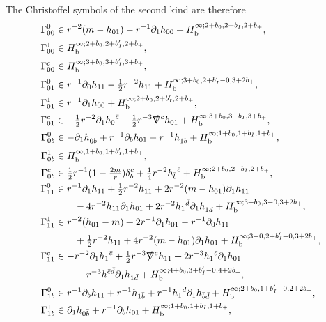\documentclass[reqno,11pt,letterpaper]{amsart}
\numberwithin{equation}{section}
\numberwithin{figure}{section}
\theoremstyle{definition}
\theoremstyle{remark}
\newcommand{\slnabla}{\slashed{\nabla}{}}
\newcommand{\pa}{\partial}
\newcommand{\bop}{{\mathrm{b}}}
\newcommand{\half}{\tfrac{1}{2}}
\newcommand{\Hb}{H_{\bop}}
\begin{document}
The Christoffel symbols of the second kind are therefore
\begin{align}
\label{EqCoPertGamma}
  \Gamma^0_{0 0} &\in r^{-2}(m-h_{0 1}) - r^{-1}\pa_1 h_{0 0} + \Hb^{\infty;2+b_0,2+b_I,2+b_+}, \\
  \Gamma^1_{0 0} &\in \Hb^{\infty;2+b_0,2+b'_I,2+b_+}, \nonumber\\
  \Gamma^c_{0 0} &\in \Hb^{\infty;3+b_0,3+b'_I,3+b_+}, \nonumber\\
  \Gamma^0_{0 1} &\in r^{-1}\pa_0 h_{1 1}-\half r^{-2}h_{1 1}+\Hb^{\infty;3+b_0,2+b'_I-0,3+2 b_+}, \nonumber\\
  \Gamma^1_{0 1} &\in r^{-1}\pa_1 h_{0 0} + \Hb^{\infty;2+b_0,2+b'_I,2+b_+}, \nonumber\\
  \Gamma^c_{0 1} &\in -\half r^{-2}\pa_1 h_0{}^{\bar c}+\half r^{-3}\slnabla^c h_{0 1} + \Hb^{\infty;3+b_0,3+b_I,3+b_+}, \nonumber\\
  \Gamma^0_{0 b} &\in -\pa_1 h_{0\bar b}+r^{-1}\pa_b h_{0 1}-r^{-1}h_{1\bar b} + \Hb^{\infty;1+b_0,1+b_I,1+b_+}, \nonumber\\
  \Gamma^1_{0 b} &\in \Hb^{\infty;1+b_0,1+b'_I,1+b_+}, \nonumber\\
  \Gamma^c_{0 b} &\in \half r^{-1}(1-\tfrac{2 m}{r})\delta_b^c + \tfrac14 r^{-2}h_{\bar b}{}^{\bar c} + \Hb^{\infty;2+b_0,2+b_I,2+b_+}, \nonumber\\
  \Gamma^0_{1 1} &\in r^{-1}\pa_1 h_{1 1}+\half r^{-2}h_{1 1} + 2 r^{-2}(m-h_{0 1})\pa_1 h_{1 1} \nonumber\\
    &\qquad - 4 r^{-2}h_{1 1}\pa_1 h_{0 1} + 2 r^{-2}h_1{}^{\bar d}\pa_1 h_{1\bar d} + \Hb^{\infty;3+b_0,3-0,3+2 b_+}, \nonumber\\
  \Gamma^1_{1 1} &\in r^{-2}(h_{0 1}-m)+2 r^{-1}\pa_1 h_{0 1}-r^{-1}\pa_0 h_{1 1} \nonumber\\
    &\qquad +\half r^{-2}h_{1 1}+4 r^{-2}(m-h_{0 1})\pa_1 h_{0 1} + \Hb^{\infty;3-0,2+b'_I-0,3+2 b_+}, \nonumber\\
  \Gamma^c_{1 1} &\in -r^{-2}\pa_1 h_1{}^{\bar c}+\half r^{-3}\slnabla^c h_{1 1}+2 r^{-3}h_1{}^{\bar c}\pa_1 h_{0 1} \nonumber\\
    &\qquad -r^{-3}h^{\bar c\bar d}\pa_1 h_{1\bar d} + \Hb^{\infty;4+b_0,3+b'_I-0,4+2 b_+}, \nonumber\\
  \Gamma^0_{1 b} &\in r^{-1}\pa_b h_{1 1}+r^{-1}h_{1\bar b}+r^{-1}h_1{}^{\bar d}\pa_1 h_{\bar b\bar d} + \Hb^{\infty;2+b_0,1+b'_I-0,2+2 b_+}, \nonumber\\
  \Gamma^1_{1 b} &\in \pa_1 h_{0\bar b}+r^{-1}\pa_b h_{0 1} + \Hb^{\infty;1+b_0,1+b_I,1+b_+}, \nonumber\\

\end{align}
\end{document}
